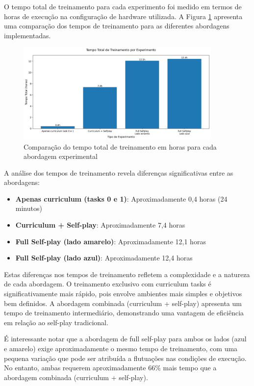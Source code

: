 O tempo total de treinamento para cada experimento foi medido em termos de horas de execução na configuração de hardware utilizada. A Figura \ref{fig:tempo_treinamento} apresenta uma comparação dos tempos de treinamento para as diferentes abordagens implementadas.

\begin{figure}[H]
    \centering
    \includegraphics[width=0.9\textwidth]{fig/graficos_trabalho/graficos_experimentos/graficos_tempo_treino/tempo_treinamento.png}
    \caption{Comparação do tempo total de treinamento em horas para cada abordagem experimental}
    \label{fig:tempo_treinamento}
\end{figure}

A análise dos tempos de treinamento revela diferenças significativas entre as abordagens:

\begin{itemize}
    \item \textbf{Apenas curriculum (tasks 0 e 1)}: Aproximadamente 0,4 horas (24 minutos)
    \item \textbf{Curriculum + Self-play}: Aproximadamente 7,4 horas
    \item \textbf{Full Self-play (lado amarelo)}: Aproximadamente 12,1 horas
    \item \textbf{Full Self-play (lado azul)}: Aproximadamente 12,4 horas
\end{itemize}

Estas diferenças nos tempos de treinamento refletem a complexidade e a natureza de cada abordagem. O treinamento exclusivo com curriculum tasks é significativamente mais rápido, pois envolve ambientes mais simples e objetivos bem definidos. A abordagem combinada (curriculum + self-play) apresenta um tempo de treinamento intermediário, demonstrando uma vantagem de eficiência em relação ao self-play tradicional.

É interessante notar que a abordagem de full self-play para ambos os lados (azul e amarelo) exige aproximadamente o mesmo tempo de treinamento, com uma pequena variação que pode ser atribuída a flutuações nas condições de execução. No entanto, ambas requerem aproximadamente 66\% mais tempo que a abordagem combinada (curriculum + self-play).

